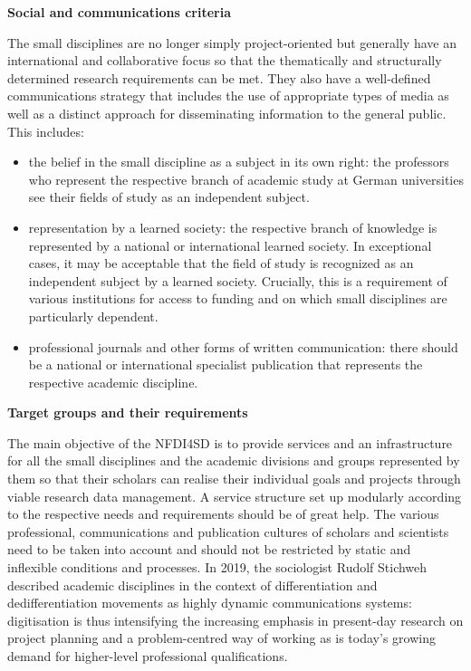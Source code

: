 \documentclass[
  english,
  paper=a4,
  oneside,captions=tableheading
]{scrbook}
\begin{document}
\textbf{Social and communications criteria}

The small disciplines are no longer simply project-oriented but
generally have an international and collaborative focus so that the
thematically and structurally determined research requirements can be
met. They also have a well-defined communications strategy that includes
the use of appropriate types of media as well as a distinct approach for
disseminating information to the general public. This includes:

\begin{itemize}
\item
  the belief in the small discipline as a subject in its own right: the
  professors who represent the respective branch of academic study at
  German universities see their fields of study as an independent
  subject.
\item
  representation by a learned society: the respective branch of
  knowledge is represented by a national or international learned
  society. In exceptional cases, it may be acceptable that the field of
  study is recognized as an independent subject by a learned society.
  Crucially, this is a requirement of various institutions for access to
  funding and on which small disciplines are particularly dependent.
\item
  professional journals and other forms of written communication: there
  should be a national or international specialist publication that
  represents the respective academic discipline.
\end{itemize}

\textbf{Target groups and their requirements}

The main objective of the NFDI4SD is to provide services and an
infrastructure for all the small disciplines and the academic divisions
and groups represented by them so that their scholars can realise their
individual goals and projects through viable research data management. A
service structure set up modularly according to the respective needs and
requirements should be of great help. The various professional,
communications and publication cultures of scholars and scientists need
to be taken into account and should not be restricted by static and
inflexible conditions and processes. In 2019, the sociologist Rudolf
Stichweh described academic disciplines in the context of
differentiation and dedifferentiation movements as highly dynamic
communications systems: digitisation is thus intensifying the increasing
emphasis in present-day research on project planning and a
problem-centred way of working as is today's growing demand for
higher-level professional qualifications.
\end{document}
